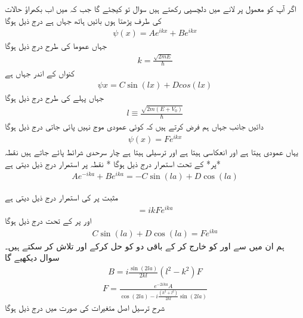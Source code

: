  اگر آپ 
 کو معمول پر لانے میں دلچسپی رکھتے ہیں سوال  تو کیجئے گا جب کہ میں اب بکھراؤ حالات  کی طرف پڑھتا ہوں بائیں ہاتھ جہاں ہے درج ذیل ہوگا 
\begin{align}\psi(x)=Ae^{ikx}+Be^{ikx} \end{align}
 جہاں عموما کی طرح درج ذیل ہوگا\begin{align}k=\frac{\sqrt{2mE}}{\hslash} \end{align}  کنواں کے اندر جہاں  ہے
\begin{align}\psi{x}=C\sin(lx)+Dcos(lx) \end{align}
  جہاں پہلے کی طرح درج ذیل ہوگا \begin{align}l\equiv \frac{\sqrt{2m(E+V_{0})}}{\hslash} \end{align}  دائیں جانب جہاں ہم فرض کرتے ہیں کہ کوئی عمودی موج نہیں پائی جاتی  درج ذیل ہوگا \begin{align}\psi(x)=Fe^{ikx} \end{align} یہاں عمودی  ہیتا ہے اور انعکاسی ہیتا  ہے اور ترسیلی ہیتا   ہے چار سرحدی شرائط پائے جاتے ہیں نقطہ *پر* کے تحت استمرار درج ذیل ہوگا *  
نقطہ  پر استمرار درج ذیل دیتی ہے
\begin{align}Ae^{-ika}+Be^{ika} = -C\sin(la)+D\cos(la) \end{align}

 مثبت پر کی استمرار درج ذیل دیتی ہے 
\begin{align}[C\cos(la)-D\sin(la)]=ikFe^{ika} \end{align}
اور  پر کے تحت درج ذیل ہوگا\begin{align}C\sin(la)+D\cos(la)=Fe^{ika} \end{align}
 ہم ان میں سے   اور  کو خارج کر کے باقی دو کو حل کرکے اور  تلاش کر سکتے ہیں۔  سوال دیکھیے گا
\begin{align}B=i\frac{\sin(2la)}{2kl}(l^{2}-k^{2})F \end{align}
\begin{align}F=\frac{e^{-2ika}A}{\cos(2la)-i\frac{(k^{2}+l^{2})}{2kl}\sin(2la)} \end{align}
  شرح ترسیل  اصل متغیرات کی صورت میں درج ذیل ہوگا

